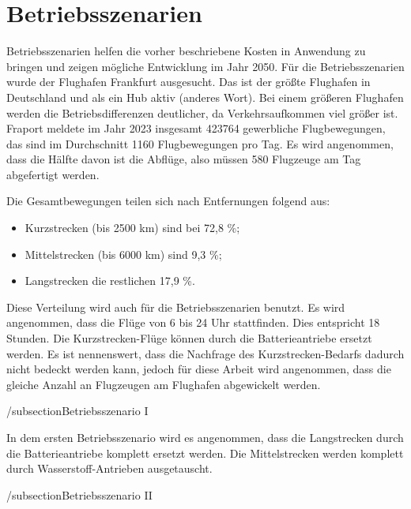 
\section{Betriebsszenarien}
Betriebsszenarien helfen die vorher beschriebene Kosten in Anwendung zu bringen und zeigen mögliche Entwicklung im Jahr 2050.
Für die Betriebsszenarien wurde der Flughafen Frankfurt ausgesucht. Das ist der größte Flughafen in Deutschland und als 
ein Hub aktiv (anderes Wort). Bei einem größeren Flughafen werden die Betriebsdifferenzen deutlicher, da Verkehrsaufkommen viel größer ist.
Fraport meldete im Jahr 2023 insgesamt 423764 gewerbliche Flugbewegungen, das sind im Durchschnitt 1160 Flugbewegungen pro Tag. 
Es wird angenommen, dass die Hälfte davon ist die Abflüge, also müssen 580 Flugzeuge am Tag abgefertigt werden.

Die Gesamtbewegungen teilen sich nach Entfernungen folgend aus:
\begin{itemize}
    \item Kurzstrecken (bis 2500 km) sind bei 72,8 \%;
    \item Mittelstrecken (bis 6000 km) sind 9,3 \%;
    \item Langstrecken die restlichen 17,9 \%. 
    \end{itemize}
Diese Verteilung wird auch für die Betriebsszenarien benutzt. Es wird angenommen, dass die Flüge von 6 bis 24 Uhr stattfinden. Dies entspricht
18 Stunden.
Die Kurzstrecken-Flüge können durch die Batterieantriebe ersetzt werden. 
Es ist nennenswert, dass die Nachfrage des Kurzstrecken-Bedarfs dadurch nicht bedeckt werden kann, jedoch für diese Arbeit wird angenommen,
dass die gleiche Anzahl an Flugzeugen am Flughafen abgewickelt werden.



/subsection{Betriebsszenario I}

In dem ersten Betriebsszenario wird es angenommen, dass die Langstrecken durch die Batterieantriebe komplett ersetzt werden.
Die Mittelstrecken werden komplett durch Wasserstoff-Antrieben ausgetauscht.

/subsection{Betriebsszenario II}